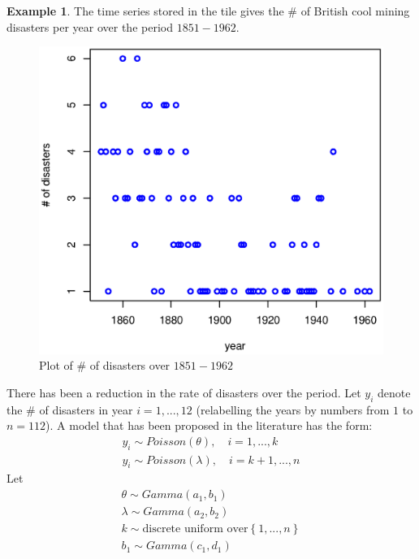 \documentclass[lecture,12pt,]{pcms-l}
\numberwithin{section}{chapter}
\numberwithin{equation}{chapter}
\theoremstyle{plain}
\theoremstyle{definition}
\newtheorem{example}{Example}[section]
\theoremstyle{definition}
\begin{document}

\begin{example}
The time series stored in the tile gives the $\#$ of British cool mining disasters per year over the period $1851-1962$.

\begin{figure}[h!]
 \includegraphics[scale=0.6]{disaster}%
  \caption{Plot of $\#$ of disasters over $1851-1962$ }
\label{fig:RejectionSampling}
\end{figure}
There has been a reduction in the rate of disasters over the period. Let $y_i$ denote the $\#$ of disasters in year $i=1,...,12$ (relabelling the years by numbers from $1$ to $n=112$). A model that has been proposed in the literature has the form:
\begin{equation*}
\begin{split}
y_i \sim Poisson(\theta), \quad i=1,...,k
\\
y_i \sim Poisson(\lambda), \quad i=k+1,...,n
\end{split}
\end{equation*}
Let 
\begin{equation*}
\begin{split}
\theta \sim Gamma(a_1,b_1)
\\
\lambda \sim Gamma(a_2,b_2)
\\
k \sim \text{discrete uniform over}\left \{1,...,n  \right \}
\\
b_1 \sim Gamma(c_1,d_1)

\end{split}
\end{equation*}
\end{example}
\end{document}
